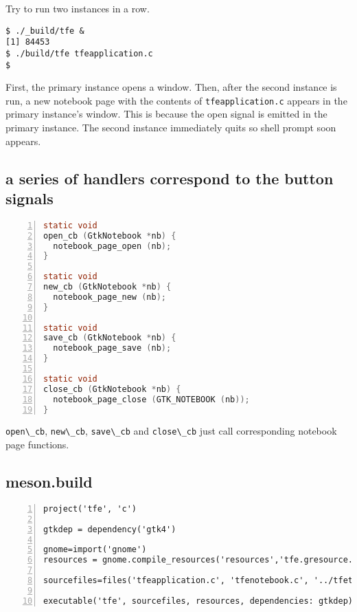 Try to run two instances in a row.

\begin{lstlisting}
$ ./_build/tfe &
[1] 84453
$ ./build/tfe tfeapplication.c
$
\end{lstlisting}

First, the primary instance opens a window. Then, after the second
instance is run, a new notebook page with the contents of
\passthrough{\lstinline!tfeapplication.c!} appears in the primary
instance's window. This is because the open signal is emitted in the
primary instance. The second instance immediately quits so shell prompt
soon appears.

\hypertarget{a-series-of-handlers-correspond-to-the-button-signals}{%
\subsection{a series of handlers correspond to the button
signals}\label{a-series-of-handlers-correspond-to-the-button-signals}}

\begin{lstlisting}[language=C, numbers=left]
static void
open_cb (GtkNotebook *nb) {
  notebook_page_open (nb);
}

static void
new_cb (GtkNotebook *nb) {
  notebook_page_new (nb);
}

static void
save_cb (GtkNotebook *nb) {
  notebook_page_save (nb);
}

static void
close_cb (GtkNotebook *nb) {
  notebook_page_close (GTK_NOTEBOOK (nb));
}
\end{lstlisting}

\passthrough{\lstinline!open\_cb!}, \passthrough{\lstinline!new\_cb!},
\passthrough{\lstinline!save\_cb!} and
\passthrough{\lstinline!close\_cb!} just call corresponding notebook
page functions.

\hypertarget{meson.build}{%
\subsection{meson.build}\label{meson.build}}

\begin{lstlisting}[numbers=left]
project('tfe', 'c')

gtkdep = dependency('gtk4')

gnome=import('gnome')
resources = gnome.compile_resources('resources','tfe.gresource.xml')

sourcefiles=files('tfeapplication.c', 'tfenotebook.c', '../tfetextview/tfetextview.c')

executable('tfe', sourcefiles, resources, dependencies: gtkdep)
\end{lstlisting}

